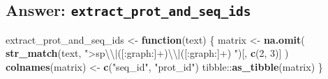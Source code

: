 \documentclass[]{book}
\newenvironment{Shaded}{}{}
\newcommand{\CharTok}[1]{\textcolor[rgb]{0.25,0.44,0.63}{#1}}
\newcommand{\ControlFlowTok}[1]{\textcolor[rgb]{0.00,0.44,0.13}{\textbf{#1}}}
\newcommand{\DecValTok}[1]{\textcolor[rgb]{0.25,0.63,0.44}{#1}}
\newcommand{\KeywordTok}[1]{\textcolor[rgb]{0.00,0.44,0.13}{\textbf{#1}}}
\newcommand{\NormalTok}[1]{#1}
\newcommand{\OperatorTok}[1]{\textcolor[rgb]{0.40,0.40,0.40}{#1}}
\newcommand{\StringTok}[1]{\textcolor[rgb]{0.25,0.44,0.63}{#1}}
\begin{document}
\hypertarget{answer-extract_prot_and_seq_ids}{%
\subsection{\texorpdfstring{Answer: \texttt{extract\_prot\_and\_seq\_ids}}{Answer: extract\_prot\_and\_seq\_ids}}\label{answer-extract_prot_and_seq_ids}}

\begin{Shaded}
\begin{Highlighting}[]
\NormalTok{extract_prot_and_seq_ids <-}\StringTok{ }\ControlFlowTok{function}\NormalTok{(text) \{}
\NormalTok{  matrix <-}\StringTok{ }\KeywordTok{na.omit}\NormalTok{(}
    \KeywordTok{str_match}\NormalTok{(text,}
      \StringTok{">sp}\CharTok{\textbackslash{}\textbackslash{}}\StringTok{|([:graph:]+)}\CharTok{\textbackslash{}\textbackslash{}}\StringTok{|([:graph:]+) "}\NormalTok{)[, }\KeywordTok{c}\NormalTok{(}\DecValTok{2}\NormalTok{, }\DecValTok{3}\NormalTok{)]}
\NormalTok{  )}
  \KeywordTok{colnames}\NormalTok{(matrix) <-}\StringTok{ }\KeywordTok{c}\NormalTok{(}\StringTok{"seq_id"}\NormalTok{, }\StringTok{"prot_id"}\NormalTok{)}
\NormalTok{  tibble}\OperatorTok{::}\KeywordTok{as_tibble}\NormalTok{(matrix)}
\NormalTok{\}}
\end{Highlighting}
\end{Shaded}

\begin{Shaded}
\end{Shaded}
\end{document}
